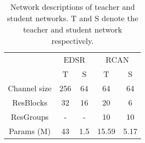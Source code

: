\documentclass[10pt,twocolumn,letterpaper]{article}
\begin{document}
\begin{table}[h]
\centering
\caption{Network descriptions of teacher and student networks. T and S denote the teacher and student network respectively.}



\begin{tabular}{|c|cc|cc|}
\hline
\multirow{2}{*}{} & \multicolumn{2}{c|}{EDSR} & \multicolumn{2}{c|}{RCAN} \\ \cline{2-5} 
                  & T           & S           & T            & S          \\ \hline
Channel size      & 256         & 64          & 64           & 64         \\
ResBlocks         & 32          & 16          & 20           & 6          \\
ResGroups         & -           & -           & 10            & 10      \\
Params (M)        & 43          & 1.5         & 15.59        & 5.17       \\ \hline
\end{tabular}

\vskip 6pt

\label{table:configuration}
\end{table}
\end{document}
